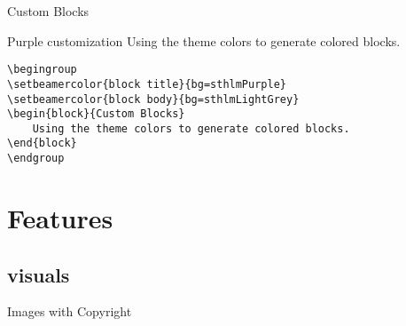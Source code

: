 \documentclass[compress]{beamer}
\begin{document}

\begin{frame}[containsverbatim]{Custom Blocks}
\begingroup
{}
\begin{block}{Purple customization}
	Using the theme colors to generate colored blocks.
\end{block}
\endgroup
\begin{lstlisting}
\begingroup
\setbeamercolor{block title}{bg=sthlmPurple}
\setbeamercolor{block body}{bg=sthlmLightGrey}
\begin{block}{Custom Blocks}
	Using the theme colors to generate colored blocks.
\end{block}
\endgroup
\end{lstlisting}
\end{frame}

%
%
\section{Features}

\subsection{visuals}


\begin{frame}{Images with Copyright}
	\begin{figure}
		\centering
	\end{figure}
\end{frame}

\end{document}
